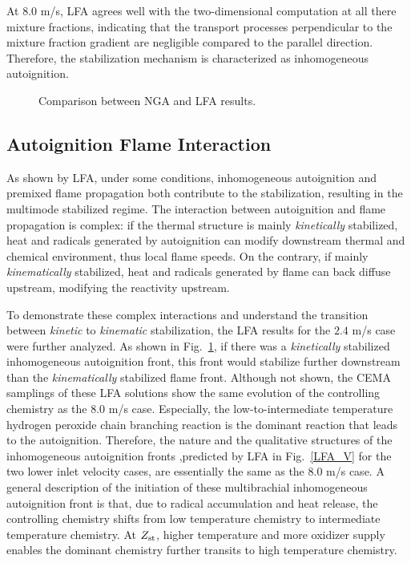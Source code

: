 \documentclass{wssci}
\begin{document}
At $8.0$ m/s, LFA agrees well with the two-dimensional computation at all there mixture fractions, indicating that the transport processes perpendicular to the mixture fraction gradient are negligible compared to the parallel direction.  Therefore, the stabilization mechanism is characterized as inhomogeneous autoignition.

\begin{figure}
  \centering
  \scriptsize
  \resizebox{0.8\textwidth}{!}{}
  \normalsize
  \vspace{-0.2in}
  \caption{Comparison between NGA and LFA results.}
  \label{fig:LFA_V}
\end{figure}

\subsection{Autoignition Flame Interaction}

As shown by LFA, under some conditions, inhomogeneous autoignition and premixed flame propagation both contribute to the stabilization, resulting in the multimode stabilized regime.  The interaction between autoignition and flame propagation is complex: if the thermal structure is mainly \emph{kinetically} stabilized, heat and radicals generated by autoignition can modify downstream thermal and chemical environment, thus local flame speeds.  On the contrary, if mainly \emph{kinematically} stabilized, heat and radicals generated by flame can back diffuse upstream, modifying the reactivity upstream.  

To demonstrate these complex interactions and understand the transition between \emph{kinetic} to \emph{kinematic} stabilization, the LFA results for the $2.4$ m/s case were further analyzed.  As shown in Fig.~\ref{fig:LFA_V}, if there was a \emph{kinetically} stabilized inhomogeneous autoignition front, this front would stabilize further downstream than the \emph{kinematically} stabilized flame front.  Although not shown, the CEMA samplings of these LFA solutions show the same evolution of the controlling chemistry as the $8.0$ m/s case.  Especially, the low-to-intermediate temperature hydrogen peroxide chain branching reaction is the dominant reaction that leads to the autoignition.  Therefore, the nature and the qualitative structures of the inhomogeneous autoignition fronts ,predicted by LFA in Fig.~\ref{LFA_V} for the two lower inlet velocity cases, are essentially the same as the $8.0$ m/s case.  A general description of the initiation of these multibrachial inhomogeneous autoignition front is that, due to radical accumulation and heat release, the controlling chemistry shifts from low temperature chemistry to intermediate temperature chemistry.  At $Z_{\rm st}$, higher temperature and more oxidizer supply enables the dominant chemistry further transits to high temperature chemistry.   
\end{document}
